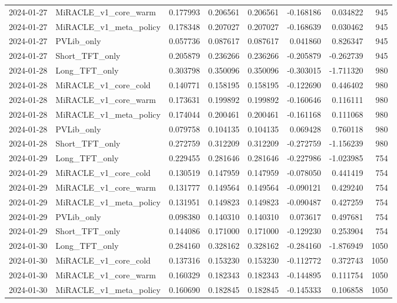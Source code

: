 \begin{tabular}{llrrrrrr}
2024-01-27 & MiRACLE_v1_core_warm & 0.177993 & 0.206561 & 0.206561 & -0.168186 & 0.034822 & 945 \\
2024-01-27 & MiRACLE_v1_meta_policy & 0.178348 & 0.207027 & 0.207027 & -0.168639 & 0.030462 & 945 \\
2024-01-27 & PVLib_only & 0.057736 & 0.087617 & 0.087617 & 0.041860 & 0.826347 & 945 \\
2024-01-27 & Short_TFT_only & 0.205879 & 0.236266 & 0.236266 & -0.205879 & -0.262739 & 945 \\
2024-01-28 & Long_TFT_only & 0.303798 & 0.350096 & 0.350096 & -0.303015 & -1.711320 & 980 \\
2024-01-28 & MiRACLE_v1_core_cold & 0.140771 & 0.158195 & 0.158195 & -0.122690 & 0.446402 & 980 \\
2024-01-28 & MiRACLE_v1_core_warm & 0.173631 & 0.199892 & 0.199892 & -0.160646 & 0.116111 & 980 \\
2024-01-28 & MiRACLE_v1_meta_policy & 0.174044 & 0.200461 & 0.200461 & -0.161168 & 0.111068 & 980 \\
2024-01-28 & PVLib_only & 0.079758 & 0.104135 & 0.104135 & 0.069428 & 0.760118 & 980 \\
2024-01-28 & Short_TFT_only & 0.272759 & 0.312209 & 0.312209 & -0.272759 & -1.156239 & 980 \\
2024-01-29 & Long_TFT_only & 0.229455 & 0.281646 & 0.281646 & -0.227986 & -1.023985 & 754 \\
2024-01-29 & MiRACLE_v1_core_cold & 0.130519 & 0.147959 & 0.147959 & -0.078050 & 0.441419 & 754 \\
2024-01-29 & MiRACLE_v1_core_warm & 0.131777 & 0.149564 & 0.149564 & -0.090121 & 0.429240 & 754 \\
2024-01-29 & MiRACLE_v1_meta_policy & 0.131951 & 0.149823 & 0.149823 & -0.090487 & 0.427259 & 754 \\
2024-01-29 & PVLib_only & 0.098380 & 0.140310 & 0.140310 & 0.073617 & 0.497681 & 754 \\
2024-01-29 & Short_TFT_only & 0.144086 & 0.171000 & 0.171000 & -0.129230 & 0.253904 & 754 \\
2024-01-30 & Long_TFT_only & 0.284160 & 0.328162 & 0.328162 & -0.284160 & -1.876949 & 1050 \\
2024-01-30 & MiRACLE_v1_core_cold & 0.137316 & 0.153230 & 0.153230 & -0.112772 & 0.372743 & 1050 \\
2024-01-30 & MiRACLE_v1_core_warm & 0.160329 & 0.182343 & 0.182343 & -0.144895 & 0.111754 & 1050 \\
2024-01-30 & MiRACLE_v1_meta_policy & 0.160690 & 0.182845 & 0.182845 & -0.145333 & 0.106858 & 1050 \\

\end{tabular}

